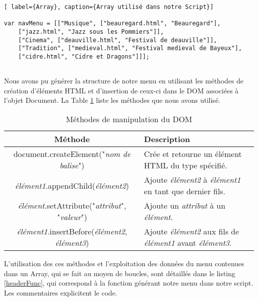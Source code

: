 \documentclass{scrartcl}
\begin{document}
\begin{lstlisting}[ label={Array}, caption={Array utilisé dans notre Script}]

var navMenu = [["Musique", ["beauregard.html", "Beauregard"], 
    ["jazz.html", "Jazz sous les Pommiers"]], 
    ["Cinema", ["deauville.html", "Festival de deauville"]], 
    ["Tradition", ["medieval.html", "Festival medieval de Bayeux"], 
    ["cidre.html", "Cidre et Dragons"]]];


\end{lstlisting}


Nous avons pu générer la structure de notre menu en utilisant les méthodes de création d'éléments HTML et d'insertion de ceux-ci dans le DOM associées à l'objet Document. La Table \ref{DOM methods} liste les méthodes que nous avons utilisé.

\begin{table}[htbp]
\renewcommand{\arraystretch}{1.5}
\caption{Méthodes de manipulation du DOM}
\label{DOM methods} 
\centering
\begin{tabular}{|c|p{7cm}|}
\hline
\textbf{Méthode} & \textbf{Description}\\
\hline
document.createElement("\textit{nom de balise}") & Crée et retourne un élément HTML du type spécifié.\\
\hline
\textit{élément1}.appendChild(\textit{élément2}) & Ajoute \textit{élément2} à \textit{élément1} en tant que dernier fils.\\
\hline
\textit{élément}.setAttribute("\textit{attribut}", "\textit{valeur}") & Ajoute un \textit{attribut} à un \textit{élément}.\\
\hline
\textit{élément1}.insertBefore(\textit{élément2}, \textit{élément3}) & Ajoute \textit{élément2} aux fils de \textit{élément1} avant \textit{élément3}.\\
\hline

\end{tabular}
\end{table}

L'utilisation des ces méthodes et l'exploitation des données du menu contenues dans un Array, qui se fait au moyen de boucles, sont détaillés dans le listing \ref{headerFunc}, qui correspond à la fonction générant notre menu dans notre script. Les commentaires explicitent le code.
\end{document}
